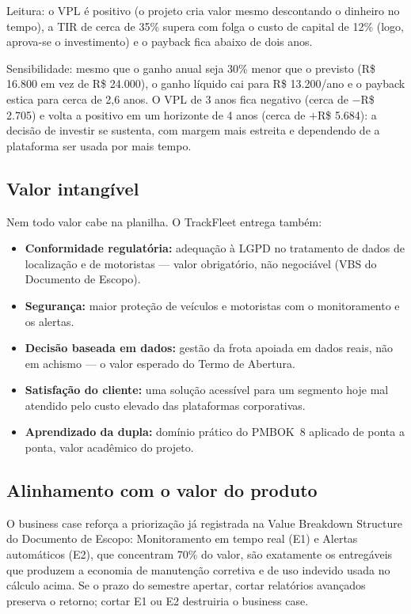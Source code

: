\documentclass[11pt,a4paper]{article}
\begin{document}
\noindent Leitura: o VPL é positivo (o projeto cria valor mesmo descontando o dinheiro no tempo), a TIR de cerca de 35\% supera com folga o custo de capital de 12\% (logo, aprova-se o investimento) e o payback fica abaixo de dois anos.

\noindent Sensibilidade: mesmo que o ganho anual seja 30\% menor que o previsto (R\$ 16.800 em vez de R\$ 24.000), o ganho líquido cai para R\$ 13.200/ano e o payback estica para cerca de 2,6 anos. O VPL de 3 anos fica negativo (cerca de $-$R\$ 2.705) e volta a positivo em um horizonte de 4 anos (cerca de $+$R\$ 5.684): a decisão de investir se sustenta, com margem mais estreita e dependendo de a plataforma ser usada por mais tempo.

\subsection{Valor intangível}
Nem todo valor cabe na planilha. O TrackFleet entrega também:
\begin{itemize}[itemsep=2pt]
  \item \textbf{Conformidade regulatória:} adequação à LGPD no tratamento de dados de localização e de motoristas --- valor obrigatório, não negociável (VBS do Documento de Escopo).
  \item \textbf{Segurança:} maior proteção de veículos e motoristas com o monitoramento e os alertas.
  \item \textbf{Decisão baseada em dados:} gestão da frota apoiada em dados reais, não em achismo --- o valor esperado do Termo de Abertura.
  \item \textbf{Satisfação do cliente:} uma solução acessível para um segmento hoje mal atendido pelo custo elevado das plataformas corporativas.
  \item \textbf{Aprendizado da dupla:} domínio prático do PMBOK\textregistered\ 8 aplicado de ponta a ponta, valor acadêmico do projeto.
\end{itemize}

\subsection{Alinhamento com o valor do produto}
O business case reforça a priorização já registrada na Value Breakdown Structure do Documento de Escopo: Monitoramento em tempo real (E1) e Alertas automáticos (E2), que concentram 70\% do valor, são exatamente os entregáveis que produzem a economia de manutenção corretiva e de uso indevido usada no cálculo acima. Se o prazo do semestre apertar, cortar relatórios avançados preserva o retorno; cortar E1 ou E2 destruiria o business case.
\end{document}
